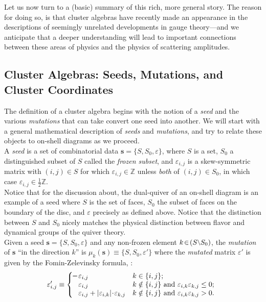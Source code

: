 \documentclass[12pt,hyperref,compress]{JHEP3}
\newcommand{\eq}[1]{\begin{equation}#1\end{equation}}
\newcommand{\mi}{{\rm\rule[2.4pt]{6pt}{0.65pt}}}
\begin{document}
Let us now turn to a (basic) summary of this rich, more general story. The reason for doing so, is that cluster algebras have recently made an appearance in the descriptions of seemingly unrelated developments in gauge theory---and we anticipate that a deeper understanding will lead to important connections between these areas of physics and the physics of scattering amplitudes.



\newpage
\subsection{Cluster Algebras: Seeds, Mutations, and Cluster Coordinates}\label{cluster_coordinates_and_mutations_subsection}

The definition of a cluster algebra \cite{FZ} begins with the notion of a {\it seed} and the various {\it mutations} that can take convert one seed into another. We will start with a general mathematical description of {\it seeds} and {\it mutations}, and try to relate these objects to on-shell diagrams as we proceed.\\[-7pt]

 A {\it seed} is a set of combinatorial data $\mathbf{s}\!=\!\{S,S_0,\varepsilon\}$, where $S$ is a set, $S_0$ a distinguished subset of $S$ called the {\it frozen subset}, and $\varepsilon_{i,j}$ is a skew-symmetric matrix with $(i,j)\!\in\!S$ for which $\varepsilon_{i,j}\!\in\!\mathbb{Z}$ unless {\it both} of $(i,j)\!\in\!S_0$, in which case $\varepsilon_{i,j}\in\frac{1}{2}\mathbb{Z}$. \\[-7pt]

Notice that for the discussion about, the dual-quiver of an on-shell diagram is an example of a seed where $S$ is the set of faces, $S_0$ the subset of faces on the boundary of the disc, and $\varepsilon$ precisely as defined above. Notice that the distinction between $S$ and $S_0$ nicely matches the physical distinction between flavor and dynamical groups of the quiver theory.\\[-7pt]

 Given a seed $\mathbf{s}\!=\!\{S,S_0,\varepsilon\}$ and any non-frozen element $k\!\in\!(S\raisebox{1pt}{\text{{\footnotesize$\backslash$}}} S_0)$, the {\it mutation} of $\mathbf{s}$ ``in the direction $k$'' is $\mu_k(\mathbf{s})\!\equiv\!\{S,S_0,\varepsilon'\}$ where the {\it mutated} matrix $\varepsilon'$ is given by the Fomin-Zelevinsky formula, \cite{FZ}:
\vspace{-.2cm}\eq{\varepsilon_{i,j}'\equiv\left\{\begin{array}{@{}l@{$\quad$}l}\mi\,\varepsilon_{i,j}&k\in\{i,j\};\\\phantom{\mi\,}\varepsilon_{i,j}&k\notin\{i,j\}\text{ and }\varepsilon_{i,k}\varepsilon_{k,j}\leq0;\\\phantom{\mi\,}\varepsilon_{i,j}+|\varepsilon_{i,k}|\!\cdot\!\varepsilon_{k,j}&k\notin\{i,j\}\text{ and }\varepsilon_{i,k}\varepsilon_{k,j}>0.\end{array}\right.\vspace{-.2cm}\label{5.11.03.6}}
\end{document}
